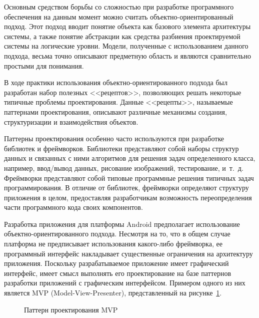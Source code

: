 Основным средством борьбы со сложностью при разработке программного обеспечения
на данным момент можно считать объектно-ориентированный подход.
Этот подход вводит понятие объекта как базового элемента
архитектуры системы, а также понятие абстракции как средства
разбиения проектируемой системы на логические уровни.
Модели, полученные с использованием данного подхода, весьма точно
описывают предметную область и являются сравнительно простыми для понимания.

В ходе практики использования объектно-ориентированного подхода
был разработан набор полезных <<рецептов>>,
позволяющих решать некоторые типичные проблемы проектирования.
Данные <<рецепты>>, называемые паттернами проектирования,
описывают различные механизмы создания, структуризации и взаимодействия объектов.

Паттерны проектирования особенно часто используются при разработке
библиотек и фреймворков.
Библиотеки представляют собой наборы структур данных и
связанных с ними алгоритмов для решения задач определенного класса,
например, ввод/вывод данных, рисование изображений, тестирование, и~т.~д.
Фреймворки представляют собой типовые программные решения
типичных задач программирования.
В отличие от библиотек, фреймворки определяют структуру приложения в целом,
предоставляя разработчикам возможность переопределения
части программного кода своих компонентов.

Разработка приложения для платформы Android предполагает использование
объектно-ориентированного подхода. Несмотря на то, что в общем случае
платформа не предписывает использования какого-либо фреймворка,
ее программный интерфейс накладывает существенные ограничения на
архитектуру приложения.
Поскольку разрабатываемое приложение имеет графический интерфейс,
имеет смысл выполнять его проектирование на базе паттернов
разработки приложений с графическим интерфейсом.
Примером одного из них является MVP (Model-View-Presenter),
представленный на рисунке~\ref{fig:design_mvp}.

\begin{figure}[h!]
  \centering
  \caption{Паттерн проектирования MVP}
  \label{fig:design_mvp}
\end{figure}

